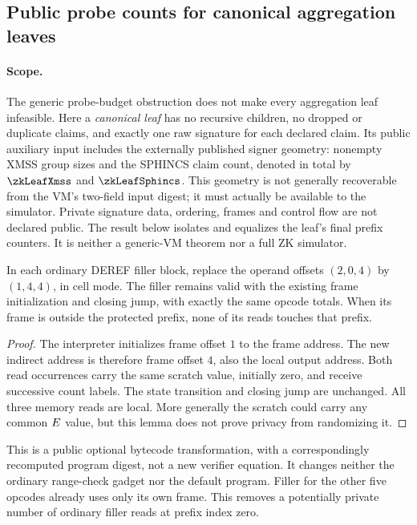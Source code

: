 \subsection{Public probe counts for canonical aggregation leaves}\label{note:zk-leaf-probes}

\paragraph{Scope.} The generic probe-budget obstruction does not make every aggregation leaf infeasible. Here a \emph{canonical leaf} has no recursive children, no dropped or duplicate claims, and exactly one raw signature for each declared claim. Its public auxiliary input includes the externally published signer geometry: nonempty XMSS group sizes and the SPHINCS claim count, denoted in total by $\zkLeafXmss$ and $\zkLeafSphincs$. This geometry is not generally recoverable from the VM's two-field input digest; it must actually be available to the simulator. Private signature data, ordering, frames and control flow are not declared public. The result below isolates and equalizes the leaf's final prefix counters. It is neither a generic-VM theorem nor a full ZK simulator.

\begin{lemma}\label{lem:zk-local-deref-filler}
In each ordinary DEREF filler block, replace the operand offsets $(2,0,4)$ by $(1,4,4)$, in cell mode. The filler remains valid with the existing frame initialization and closing jump, with exactly the same opcode totals. When its frame is outside the protected prefix, none of its reads touches that prefix.
\end{lemma}
\begin{proof}
The interpreter initializes frame offset $1$ to the frame address. The new indirect address is therefore frame offset $4$, also the local output address. Both read occurrences carry the same scratch value, initially zero, and receive successive count labels. The state transition and closing jump are unchanged. All three memory reads are local. More generally the scratch could carry any common $E$ value, but this lemma does not prove privacy from randomizing it.
\end{proof}

This is a public optional bytecode transformation, with a correspondingly recomputed program digest, not a new verifier equation. It changes neither the ordinary range-check gadget nor the default program. Filler for the other five opcodes already uses only its own frame. This removes a potentially private number of ordinary filler reads at prefix index zero.

